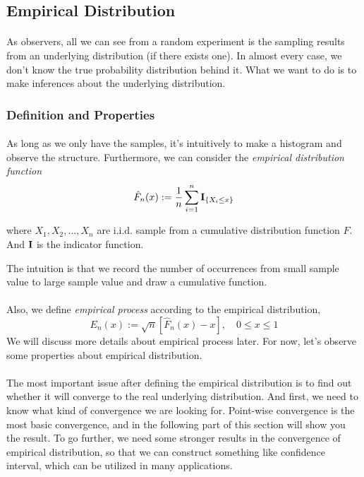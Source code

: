\documentclass[final_project_1.tex]{subfiles}
\begin{document}
\subsection{Empirical Distribution}
\paragraph{}
As observers, all we can see from a random experiment is the sampling results from an underlying distribution (if there exists one). In almost every case, we don't know the true probability distribution behind it. What we want to do is to make inferences about the underlying distribution.

\subsubsection{Definition and Properties}
\paragraph{}
As long as we only have the samples, it's intuitively to make a histogram and observe the structure. Furthermore, we can consider the {\it empirical distribution function}
$$\hat{F}_n(x):=\frac{1}{n}\sum^{n}_{i=1}{\bf I}_{\{X_i\leq x\}}$$

where $X_1, X_2, ..., X_n$ are i.i.d. sample from a cumulative distribution function $F$. And ${\bf I}$ is the indicator function.

The intuition is that we record the number of occurrences from small sample value to large sample value and draw a cumulative function.

\paragraph{}
Also, we define {\it empirical process} according to the empirical distribution,
$$E_n(x):=\sqrt{n}[\hat{F}_n(x)-x],\quad 0\leq x\leq 1$$
We will discuss more details about empirical process later. For now, let's observe some properties about empirical distribution.

\paragraph{}
The most important issue after defining the empirical distribution is to find out whether it will converge to the real underlying distribution. And first, we need to know what kind of convergence we are looking for. Point-wise convergence is the most basic convergence, and in the following part of this section will show you the result. To go further, we need some stronger results in the convergence of empirical distribution, so that we can construct something like confidence interval, which can be utilized in many applications.
\end{document}
